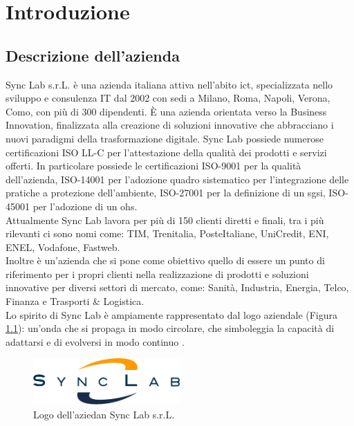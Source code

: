 \chapter{Introduzione}
\label{cap:introduzione}
\section{Descrizione dell'azienda}
Sync Lab s.r.L. è una azienda italiana attiva nell'abito \gls{ict}{}, specializzata nello sviluppo e consulenza IT dal 2002 con sedi a 
Milano, Roma, Napoli, Verona, Como, con più di 300 dipendenti. È una azienda orientata verso la \gls{Business Innovation}{}, finalizzata alla 
creazione di soluzioni innovative che abbracciano i nuovi paradigmi della trasformazione digitale.
Sync Lab possiede numerose certificazioni ISO LL-C per l'attestazione della 
qualità dei prodotti e servizi offerti. In particolare possiede le certificazioni 
ISO-9001 per la qualità dell'azienda, ISO-14001 per l'adozione quadro sistematico per l'integrazione delle pratiche a protezione dell'ambiente, ISO-27001 per la definizione di un \gls{sgsi}{}, ISO-45001 per l'adozione di un \gls{ohs}{}.
\\
Attualmente Sync Lab  lavora per più di 150 clienti diretti e finali, tra i più rilevanti ci sono nomi come: TIM, Trenitalia, PosteItaliane, UniCredit, ENI, ENEL, Vodafone, Fastweb.
\\
Inoltre è un'azienda che si pone come obiettivo quello di essere un punto di riferimento per i propri clienti nella realizzazione di prodotti e soluzioni innovative per diversi settori di mercato, come: Sanità, Industria, Energia, Telco, Finanza e Trasporti \& Logistica.\\
Lo spirito di Sync Lab è ampiamente rappresentato dal logo aziendale (Figura \ref{figure:logo_azienda}): un'onda che si propaga in modo circolare, che simboleggia la capacità di adattarsi e di evolversi in modo continuo \cite{site:SycLab}.\\
\begin{figure}[htbp]  
\centering
    \includegraphics[width=0.5\textwidth]{images/introduzione/logo_azienda.png}
    \caption{Logo dell'aziedan Sync Lab s.r.L.}
    \label{figure:logo_azienda}
\end{figure}
\pagebreak
